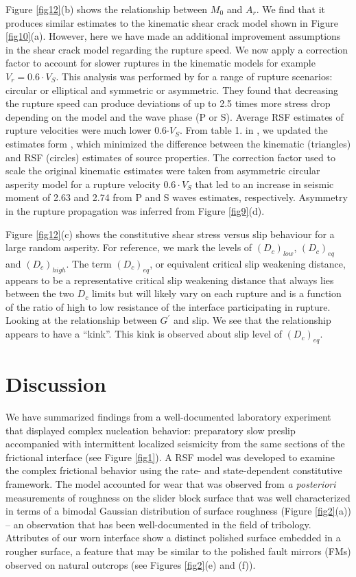 \documentclass[preprint,1p, 10pt,authoryear]{elsarticle}
\begin{document}
Figure \ref{fig12}(b) shows the relationship between $M_{0}$ and $A_{r}$. We find that it produces similar estimates to the kinematic shear crack model shown in Figure \ref{fig10}(a). However, here we have made an additional improvement assumptions in the shear crack model regarding the rupture speed.  We now apply a correction factor to account for slower ruptures in the kinematic models for example $V_{r} = 0.6\cdot V_{S}$.  This analysis was performed by \citet{Kaneko2015} for a range of rupture scenarios: circular or elliptical and symmetric or asymmetric.  They found that decreasing the rupture speed can produce deviations of up to 2.5 times more stress drop depending on the model and the wave phase (P or S).  Average RSF estimates of rupture velocities were much lower 0.6$\cdot V_{S}$.  From table 1. in \citet{Kaneko2015}, we updated the estimates form \citet{Selvadurai2019}, which minimized the difference between the kinematic (triangles) and RSF (circles) estimates of source properties.  The correction factor used to scale the original kinematic estimates were taken from asymmetric circular asperity model for a rupture velocity $0.6\cdot V_{S}$ that led to an increase in seismic moment of 2.63 and 2.74 from P and S waves estimates, respectively.  Asymmetry in the rupture propagation was inferred from Figure \ref{fig9}(d).

Figure \ref{fig12}(c) shows the constitutive shear stress versus slip behaviour for a large random asperity. For reference, we mark the levels of $(D_{c})_{low}$, $(D_{c})_{eq}$ and $(D_{c})_{high}$.  The term $(D_{c})_{eq}$, or equivalent critical slip weakening distance, appears to be a representative critical slip weakening distance that always lies between the two $D_{c}$ limits but will likely vary on each rupture and is a function of the ratio of high to low resistance of the interface participating in rupture. Looking at the relationship between $G^{'}$ and slip. We see that the relationship appears to have a ``kink''.  This kink is observed about slip level of  $(D_{c})_{eq}$. 

\section{Discussion}
We have summarized findings from a well-documented laboratory experiment \citep{Selvadurai2015, Selvadurai2017, Selvadurai2019} that displayed complex nucleation behavior: preparatory slow preslip accompanied with intermittent localized seismicity from the same sections of the frictional interface (see Figure \ref{fig1}). A RSF model was developed to examine the complex frictional behavior using the rate- and state-dependent constitutive framework. The model accounted for wear that was observed from \textit{a posteriori} measurements of roughness on the slider block surface that was well characterized in terms of a bimodal Gaussian distribution of surface roughness (Figure \ref{fig2}(a)) -- an observation that has been well-documented in the field of tribology. Attributes of our worn interface show a distinct polished surface embedded in a rougher surface, a feature that may be similar to the polished fault mirrors (FMs) observed on natural outcrops (see Figures \ref{fig2}(e) and (f)).
\end{document}
